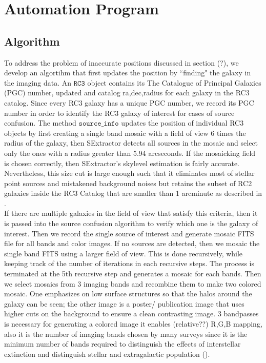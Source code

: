 \documentclass[5p]{elsarticle}
\begin{document}
\section{Automation Program}

	\subsection{Algorithm}
	To address the problem of inaccurate positions discussed in section (?), we develop an algortihm that first updates the position by ``finding" the galaxy in the imaging data. 
	An  $\texttt{RC3}$ object contains its The Catalogue of Principal Galaxies (PGC) number, updated and catalog ra,dec,radius for each galaxy in the RC3 catalog. Since every RC3 galaxy has a unique PGC number, we record  its PGC number in order to identify the RC3 galaxy of interest for cases of source confusion. The method $\texttt{source\_info}$ updates the position of individual RC3 objects by first creating a single band mosaic with a field of view 6 times the radius of the galaxy, then SExtractor detects all sources in the mosaic and select only the ones with a radius greater than 5.94 arcseconds.  If the mosaicking field is chosen correctly, then SExtractor's skylevel estimation is fairly accurate.  Nevertheless, this size cut is large enough such that it eliminates most of stellar point sources and mistakened background noises  but retains the subset of RC2 galaxies inside the RC3 Catalog that are smaller than 1 arcminute as described in \citet{rc2}. 
\\
\indent If there are multiple galaxies in the field of view that satisfy this criteria, then it is passed into the source confusion algorithm to verify which one is the galaxy of interest. Then we record the single source of interest and generate mosaic FITS file for all bands and color images. If no sources are detected, then we mosaic  the single band FITS using a larger field of view. This is done recursively, while keeping track of the number of iterations in each recursive steps. The process is terminated at the 5th recursive step and generates a mosaic for each bands. Then we select mosaics from 3 imaging bands  and recombine them to make two  colored mosaic. One emphasizes on low surface structures  so that the halos around the galaxy can be seen; the other image is a poster/ publication image that uses higher cuts on the background to ensure a clean contrasting image. 3 bandpasses is necessary for generating a colored image it enables (relative??) R,G,B mapping, also it is the number of imaging bands chosen by many surveys since it is the minimum number of bands required to distinguish the effects of interstellar extinction and distinguish stellar and extragalactic population (\citet{2mass}).
\end{document}
